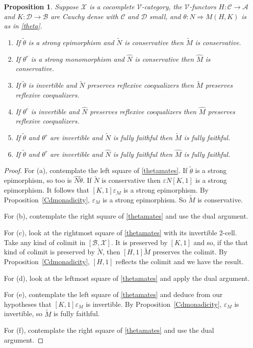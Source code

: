 \documentclass[a4paper,12pt,reqno]{amsart}
\newtheorem{proposition}[theorem]{Proposition}
\theoremstyle{definition}
\theoremstyle{fact}
\theoremstyle{genquest}
\theoremstyle{step}
\newcommand{\dd}{\colon}
\newcommand{\ra}{\rightarrow}
\def\CA{{\mathscr A}}
\def\CB{{\mathscr B}}
\def\CC{{\mathscr C}}
\def\CD{{\mathscr D}}
\def\CV{{\mathscr V}}
\def\CX{{\mathscr X}}
\begin{document}
\begin{proposition}\label{Mirror}
Suppose $\CX$ is a cocomplete $\CV$-category,
the $\CV$-functors $H\dd \CC \ra \CA$ and $K\dd \CD \ra \CB$ are Cauchy dense
with $\CC$ and $\CD$ small, and $\theta \dd N\Rightarrow M(H,K)$ is as in \eqref{theta}. 
\begin{enumerate}
\item[(a)] If $\tilde{\theta}$ is a strong epimorphism and $\widetilde{N}$ is conservative then
$\widetilde{M}$ is conservative. 
\item[(b)] If $\theta^r$ is a strong monomorphism and $\widehat{N}$ is conservative then $\widehat{M}$ is conservative.
\item[(c)] If $\tilde{\theta}$ is invertible and $\widetilde{N}$ preserves reflexive coequalizers then $\widetilde{M}$ preserves reflexive coequalizers.
\item[(d)] If $\theta^r$ is invertible and $\widehat{N}$ preserves reflexive coequalizers then $\widehat{M}$ preserves reflexive coequalizers.
\item[(e)] If $\tilde{\theta}$ and $\theta^r$ are invertible and $\widetilde{N}$ is fully faithful then $\widetilde{M}$ is fully faithful.
\item[(f)] If $\tilde{\theta}$ and $\theta^r$ are invertible and $\widehat{N}$ is fully faithful then $\widehat{M}$ is fully faithful.
\end{enumerate}
\end{proposition}
\begin{proof}
For (a), contemplate the left square of \eqref{thetamates}. 
If $\tilde{\theta}$ is a strong epimorphism, so too is $\widehat{N}\tilde{\theta}$.
If $\widetilde{N}$ is conservative then $\varepsilon{N}[K,1]$ is a strong
epimorphism. It follows that $[K,1]\varepsilon_M$ is a strong epimorphism.
By Proposition~\ref{Cdmonadicity}, $\varepsilon_M$ is a strong epimorphism.
So $\widetilde{M}$ is conservative.  

For (b), contemplate the right square of \eqref{thetamates} and use the dual argument.

For (c), look at the rightmost square of \eqref{thetamates} with its invertible 2-cell. 
Take any kind of colimit in $[\CB,\CX]$. It is preserved by $[K,1]$ and so,
if the that kind of colimit is preserved by $\widetilde{N}$, then
$[H,1]\widetilde{M}$ preserves the colimit.
By Proposition~\ref{Cdmonadicity}, $[H,1]$ reflects the colimit and we have the result.  

For (d), look at the leftmost square of \eqref{thetamates} and apply the dual argument.

For (e), contemplate the left square of \eqref{thetamates} and deduce from our hypotheses that $[K,1]\varepsilon_M$ is invertible. By Proposition~\ref{Cdmonadicity}, $\varepsilon_M$ is invertible, so $\widetilde{M}$
is fully faithful.

For (f), contemplate the right square of \eqref{thetamates} and use the dual argument. 
\end{proof}
\end{document}
